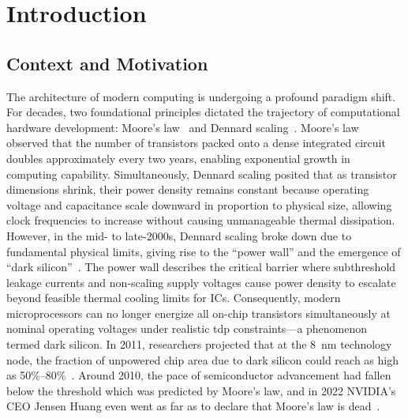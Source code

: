 
\chapter{Introduction}\doublespacing %

\label{chap:introduction}



\section{Context and Motivation}
\label{sec:context_and_motivation}

The architecture of modern computing is undergoing a profound paradigm shift. 
For decades, two foundational principles dictated the trajectory of computational hardware development:
Moore's law~\cite{moore1965cramming} and Dennard scaling~\cite{dennard1974design}.
Moore's law observed that the number of transistors packed onto a dense integrated circuit doubles approximately every two years, enabling exponential growth in computing capability.
Simultaneously, Dennard scaling posited that as transistor dimensions shrink, their power density remains constant because operating voltage and capacitance scale downward in proportion to physical size, allowing clock frequencies to increase without causing unmanageable thermal dissipation.
However, in the mid- to late-2000s, Dennard scaling broke down due to fundamental physical limits, giving rise to the ``power wall'' and the emergence of ``dark silicon''~\cite{borkar1999design,taylor2012landscape}.
The power wall describes the critical barrier where subthreshold leakage currents and non-scaling supply voltages cause power density to escalate beyond feasible thermal cooling limits for \glspl{IC}.
Consequently, modern microprocessors can no longer energize all on-chip transistors simultaneously at nominal operating voltages under realistic \gls{tdp} constraints---a phenomenon termed dark silicon.
In 2011, researchers projected that at the 8~nm technology node, the fraction of unpowered chip area due to dark silicon could reach as high as 50\%--80\%~\cite{esmaeilzadeh2011dark}.
Around 2010, the pace of semiconductor advancement had fallen below the threshold which was predicted by Moore's law, and in 2022 NVIDIA's CEO Jensen Huang even went as far as to declare that Moore's law is dead~\cite{huang2022moore}.

